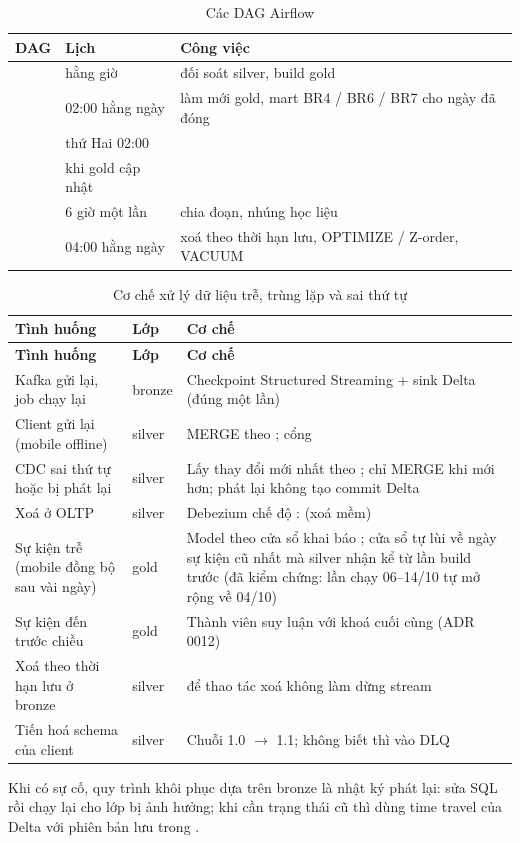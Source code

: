\begin{table}[H]
\centering\small
\caption{Các DAG Airflow}\label{tab:dags}
\begin{tabularx}{\textwidth}{@{}L{3.7cm}L{2.6cm}Y@{}}
\toprule
\textbf{DAG} & \textbf{Lịch} & \textbf{Công việc} \\
\midrule
{} & hằng giờ & đối soát silver, build gold \\
 & 02:00 hằng ngày & làm mới gold, mart BR4 / BR6 / BR7 cho ngày đã đóng \\
 & thứ Hai 02:00 &  \\
 & khi gold cập nhật &  \\
 & 6 giờ một lần & chia đoạn, nhúng học liệu \\
 & 04:00 hằng ngày & xoá theo thời hạn lưu, OPTIMIZE / Z-order, VACUUM \\
\bottomrule
\end{tabularx}
\end{table}

{\small
\begin{longtable}{@{}L{4.4cm}L{1.6cm}L{8.6cm}@{}}
\caption{Cơ chế xử lý dữ liệu trễ, trùng lặp và sai thứ tự}\label{tab:late}\\
\toprule
\textbf{Tình huống} & \textbf{Lớp} & \textbf{Cơ chế} \\
\midrule
\endfirsthead
\toprule
\textbf{Tình huống} & \textbf{Lớp} & \textbf{Cơ chế} \\
\midrule
\endhead
Kafka gửi lại, job chạy lại & bronze & Checkpoint Structured Streaming + sink Delta (đúng một lần) \\
Client gửi lại (mobile offline) & silver & MERGE theo ; cổng  \\
CDC sai thứ tự hoặc bị phát lại & silver & Lấy thay đổi mới nhất theo ; chỉ MERGE khi  mới hơn; phát lại không tạo commit Delta \\
Xoá ở OLTP & silver & Debezium chế độ :  (xoá mềm) \\
Sự kiện trễ (mobile đồng bộ sau vài ngày) & gold & Model theo cửa sổ khai báo ; cửa sổ tự lùi về ngày sự kiện cũ nhất mà silver nhận kể từ lần build trước (đã kiểm chứng: lần chạy 06--14/10 tự mở rộng về 04/10) \\
Sự kiện đến trước chiều & gold & Thành viên suy luận với khoá cuối cùng (ADR 0012) \\
Xoá theo thời hạn lưu ở bronze & silver &  để thao tác xoá không làm dừng stream \\
Tiến hoá schema của client & silver & Chuỗi  1.0 $\rightarrow$ 1.1; không biết thì vào DLQ \\
\bottomrule
\end{longtable}}

Khi có sự cố, quy trình khôi phục dựa trên bronze là nhật ký phát lại: sửa SQL rồi chạy lại  cho lớp bị ảnh hưởng; khi cần trạng thái cũ thì dùng time travel của Delta với phiên bản lưu trong .
